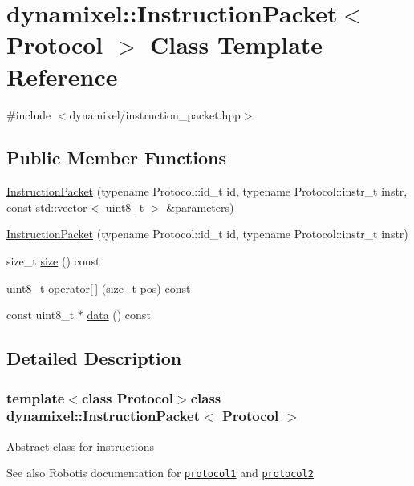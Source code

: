 \hypertarget{classdynamixel_1_1_instruction_packet}{}\section{dynamixel\+:\+:Instruction\+Packet$<$ Protocol $>$ Class Template Reference}
\label{classdynamixel_1_1_instruction_packet}


{\ttfamily \#include $<$dynamixel/instruction\+\_\+packet.\+hpp$>$}

\subsection*{Public Member Functions}
\begin{DoxyCompactItemize}
\item 
\hyperlink{classdynamixel_1_1_instruction_packet_ae625382db5cdf81fae590ce1333876fc}{Instruction\+Packet} (typename Protocol\+::id\+\_\+t id, typename Protocol\+::instr\+\_\+t instr, const std\+::vector$<$ uint8\+\_\+t $>$ \&parameters)
\item 
\hyperlink{classdynamixel_1_1_instruction_packet_acf0044f4cf51aa48cff9309dea20dfcb}{Instruction\+Packet} (typename Protocol\+::id\+\_\+t id, typename Protocol\+::instr\+\_\+t instr)
\item 
size\+\_\+t \hyperlink{classdynamixel_1_1_instruction_packet_ae4fc2dccdf71efe15934fce93e1b7222}{size} () const 
\item 
uint8\+\_\+t \hyperlink{classdynamixel_1_1_instruction_packet_a3558052abebd5412847bb2c2652f2897}{operator\mbox{[}$\,$\mbox{]}} (size\+\_\+t pos) const 
\item 
const uint8\+\_\+t $\ast$ \hyperlink{classdynamixel_1_1_instruction_packet_a9a642ac2e80dc38172166b0508101bb8}{data} () const 
\end{DoxyCompactItemize}


\subsection{Detailed Description}
\subsubsection*{template$<$class Protocol$>$class dynamixel\+::\+Instruction\+Packet$<$ Protocol $>$}

Abstract class for instructions

\begin{DoxySeeAlso}{See also}
Robotis\textquotesingle{} documentation for \href{http://support.robotis.com/en/product/actuator/dynamixel/communication/dxl_packet.htm}{\tt protocol1} and \href{http://support.robotis.com/en/product/actuator/dynamixel_pro/communication/instruction_status_packet.htm}{\tt protocol2} 
\end{DoxySeeAlso}


